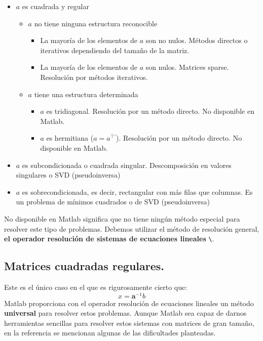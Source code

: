 \begin{itemize}
\item $a$ es cuadrada y regular

\begin{itemize}
\item $a$ no tiene ninguna estructura reconocible

\begin{itemize}
\item La mayoría de los elementos de $a$ son no nulos. Métodos directos
o iterativos dependiendo del tamaño de la matriz.
\item La mayoría de los elementos de $a$ son nulos. Matrices sparse. Resolución
por métodos iterativos.
\end{itemize}
\item $a$ tiene una estructura determinada

\begin{itemize}
\item $a$ es tridiagonal. Resolución por un método directo. No disponible
en Matlab.
\item $a$ es hermitiana ($a=a^{\top\prime}$). Resolución por un método
directo. No disponible en Matlab.
\end{itemize}
\end{itemize}
\item $a$ es subcondicionada o cuadrada singular. Descomposición en valores
singulares o SVD (pseudoinversa)
\item $a$ es sobrecondicionada, es decir, rectangular con más filas que
columnas. Es un problema de mínimos cuadrados o de SVD (pseudoinversa)
\end{itemize}
No disponible en Matlab significa que no tiene ningún método especial
para resolver este tipo de problemas. Debemos utilizar el método de
resolución general, \textbf{el operador resolución de sistemas de
ecuaciones lineales} \texttt{\textbackslash{}}.


\subsection{Matrices cuadradas regulares.}

Este es el único caso en el que es rigurosamente cierto que:
$$x=\mathbf{a}^{-1}b$$
 Matlab proporciona con el operador resolución de ecuaciones lineales
un método \textbf{universal} para resolver estos problemas. Aunque
Matlab sea capaz de darnos herramientas sencillas para resolver estos
sistemas con matrices de gran tamaño, en la referencia \cite{Numerical}
se mencionan algunas de las dificultades planteadas.

